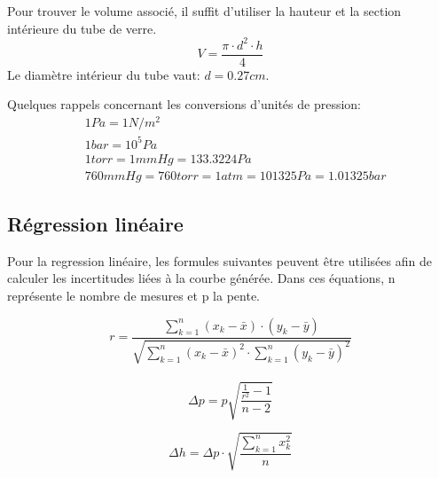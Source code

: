 Pour trouver le volume associé, il suffit d'utiliser la hauteur et la section intérieure du tube de verre.
\begin{equation}
    V = \frac{\pi \cdot d^2 \cdot h}{4}
\end{equation}
Le diamètre intérieur du tube vaut: $d=0.27cm$.

Quelques rappels concernant les conversions d'unités de pression:
\begin{align*}
    &1Pa = 1 N/m^2\\
    &1bar = 10^5 Pa\\
    &1torr = 1mmHg = 133.3224 Pa\\
    &760mmHg = 760torr=1atm=101325Pa=1.01325bar
\end{align*}

\subsection{Régression linéaire}

Pour la regression linéaire, les formules suivantes peuvent être utilisées afin de calculer les incertitudes liées à la courbe générée.
Dans ces équations, n représente le nombre de mesures et p la pente.

\begin{equation}
    \label{regressionr}
    r=\frac{\sum_{k=1}^{n}(x_k-\bar{x})\cdot(y_k-\bar{y})}{\sqrt{\sum_{k=1}^{n}(x_k-\bar{x})^2\cdot\sum_{k=1}^{n}(y_k-\bar{y})^2}}
\end{equation}
\\

\begin{equation}
    \label{deltam}
    \Delta p=p\sqrt{\frac{\frac{1}{r^2}-1}{n-2}}
\end{equation}

\begin{equation}
    \label{deltah}
    \Delta h = \Delta p \cdot \sqrt{\frac{\sum_{k=1}^{n}x_k^2}{n}}
\end{equation}
